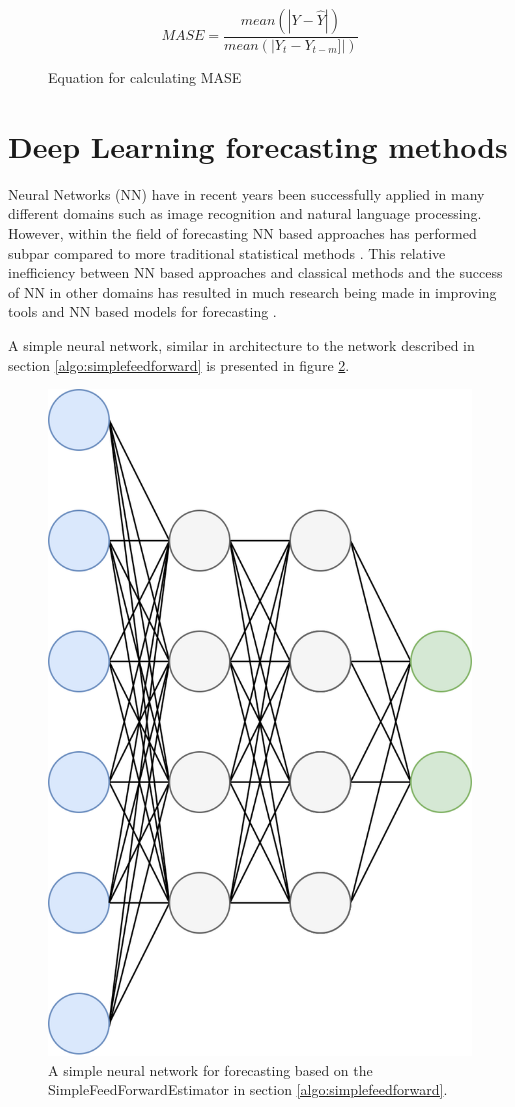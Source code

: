\begin{figure}[h]
    \[MASE = \frac{mean(|Y - \hat{Y}|)}{mean(|Y_t - Y_{t-m}]|)}\]
    \caption{Equation for calculating MASE}
    \label{eq:MASE}
\end{figure}

\section{Deep Learning forecasting methods}
\label{sec:deep_learning_methods}
Neural Networks (NN) have in recent years been successfully applied in many different domains such as image recognition and natural language processing. However, within the field of forecasting NN based approaches has performed subpar compared to more traditional statistical methods \cite{m3_competition,makridakis_m4_2020,oreshkin_n_beats_2020, other_thesis}. This relative inefficiency between NN based approaches and classical methods and the success of NN in other domains has resulted in much research being made in improving tools and NN based models for forecasting \cite{gluonts_paper}.

A simple neural network, similar in architecture to the network described in section \ref{algo:simplefeedforward} is presented in figure \ref{fig:simplefeedforward}.

\begin{figure}[htb]
    \centering
    \includegraphics[width=0.5\linewidth]{./img/simplefeedforward.png}
    \caption{A simple neural network for forecasting based on the SimpleFeedForwardEstimator in section \ref{algo:simplefeedforward}.}
    \label{fig:simplefeedforward}
\end{figure}
\clearpage

